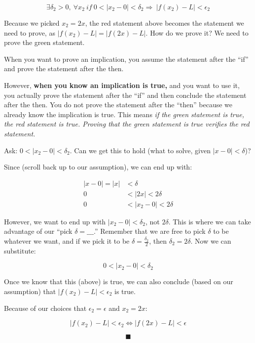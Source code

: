 \documentclass[
]{article}
\begin{document}
$$\exists\delta_{2} > 0,\ \forall x_{2}\ if\ 0 < \left| x_{2} - 0 \right| < \delta_{2} \Rightarrow \ \left| f\left( x_{2} \right) - L \right| < \epsilon_{2}$$

Because we picked $x_{2} = 2x$, the red statement above becomes the
statement we need to prove, as
$\left| f\left( x_{2} \right) - L \right| = |f(2x) - L|$. How do we
prove it? We need to prove the green statement.

When you want to prove an implication, you assume the statement after
the ``if'' and prove the statement after the then.

However, \textbf{when you know an implication is true,} and you want to
use it, you actually prove the statement after the ``if'' and then
conclude the statement after the then. You do not prove the statement
after the ``then'' because we already know the implication is true. This
means \emph{if the green statement is true, the red statement is true.
Proving that the green statement is true verifies the red statement.}

Ask: $0 < \left| x_{2} - 0 \right| < \delta_{2}$. Can we get this to
hold (what to solve, given $|x - 0| < \delta$)?

Since (scroll back up to our assumption), we can end up with:

\begin{align*}
|x - 0| = |x| &< \delta
 \\
0 &< |2x| < 2\delta
 \\
0 &< \left| x_{2} - 0 \right| < 2\delta
\end{align*}


However, we want to end up with
$\left| x_{2} - 0 \right| < \delta_{2}$, not $2\delta$. This is
where we can take advantage of our ``pick $\delta = \_\_\_$.''
Remember that we are free to pick $\delta$ to be whatever we want, and
if we pick it to be $\delta = \frac{\delta_{2}}{2}$, then
$\delta_{2} = 2\delta$. Now we can substitute:

$$0 < \left| x_{2} - 0 \right| < \delta_{2}$$

Once we know that this (above) is true, we can also conclude (based on
our assumption) that
$\left| f\left( x_{2} \right) - L \right| < \epsilon_{2}$ is true.

Because of our choices that $\epsilon_{2} = \epsilon$ and
$x_{2} = 2x$:

$$\left| f\left( x_{2} \right) - L \right| < \epsilon_{2} \Leftrightarrow \left| f(2x) - L \right| < \epsilon$$

$$\blacksquare$$
\end{document}
